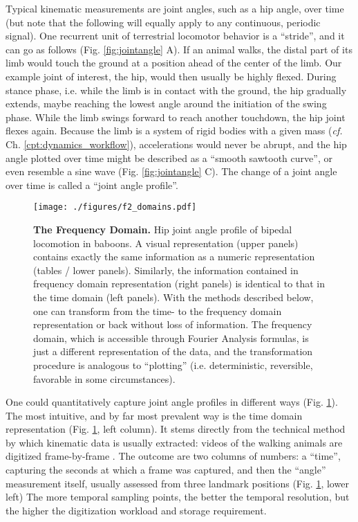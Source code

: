 Typical kinematic measurements are joint angles, such as a hip angle, over time (but note that the following will equally apply to any continuous, periodic signal).
One recurrent unit of terrestrial locomotor behavior is a ``stride'', and it can go as follows (Fig. \ref{fig:jointangle} A).
If an animal walks, the distal part of its limb would touch the ground at a position ahead of the center of the limb.
Our example joint of interest, the hip, would then usually be highly flexed.
During stance phase, i.e. while the limb is in contact with the ground, the hip gradually extends, maybe reaching the lowest angle around the initiation of the swing phase.
While the limb swings forward to reach another touchdown, the hip joint flexes again.
Because the limb is a system of rigid bodies with a given mass (\emph{cf.} Ch. \ref{cpt:dynamics_workflow}), accelerations would never be abrupt, and the hip angle plotted over time might be described as a ``smooth sawtooth curve'', or even resemble a sine wave (Fig. \ref{fig:jointangle} C).
The change of a joint angle over time is called a ``joint angle profile''.


\begin{figure}[pb]
\centering
\texttt{[image: ./figures/f2\_domains.pdf]}
\caption{\label{fig:domains}\textbf{The Frequency Domain.} Hip joint angle profile of bipedal locomotion in baboons. A visual representation (upper panels) contains exactly the same information as a numeric representation (tables / lower panels). Similarly, the information contained in frequency domain representation (right panels) is identical to that in the time domain (left panels). With the methods described below, one can transform from the time- to the frequency domain representation or back without loss of information. The frequency domain, which is accessible through Fourier Analysis formulas, is just a different representation of the data, and the transformation procedure is analogous to ``plotting'' (i.e. deterministic, reversible, favorable in some circumstances).}
\end{figure}


One could quantitatively capture joint angle profiles in different ways (Fig. \ref{fig:domains}).
The most intuitive, and by far most prevalent way is the time domain representation (Fig. \ref{fig:domains}, left column).
It stems directly from the technical method by which kinematic data is usually extracted: videos of the walking animals are digitized frame-by-frame \citep[\textit{cf.} Appendix \ref{cpt:digitization} and][]{MMielke2020}.
The outcome are two columns of numbers: a ``time'', capturing the seconds at which a frame was captured, and then the ``angle'' measurement itself, usually assessed from three landmark positions (Fig. \ref{fig:domains}, lower left)
The more temporal sampling points, the better the temporal resolution, but the higher the digitization workload and storage requirement.


